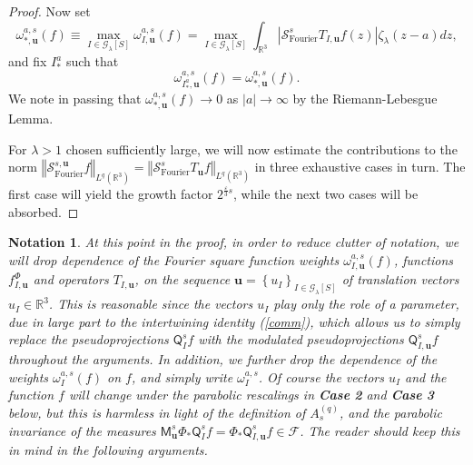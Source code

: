 \documentclass{amsart}%
\theoremstyle{plain}
\newtheorem{notation}[theorem]{Notation}
\numberwithin{equation}{section}
\begin{document}
\begin{proof}
Now set%
\[
\omega_{\ast,\mathbf{u}}^{a,s}\left(  f\right)  \equiv\max_{I\in
\mathcal{G}_{\lambda}\left[  S\right]  }\omega_{I,\mathbf{u}}^{a,s}\left(
f\right)  =\max_{I\in\mathcal{G}_{\lambda}\left[  S\right]  }\int
_{\mathbb{R}^{3}}\left\vert \mathcal{S}_{\operatorname*{Fourier}}%
^{s}T_{I,\mathbf{u}}f\left(  z\right)  \right\vert \zeta_{\lambda}\left(
z-a\right)  dz,
\]
and fix $I_{\ast}^{a}$ such that
\[
\omega_{I_{\ast}^{a},\mathbf{u}}^{a,s}\left(  f\right)  =\omega_{\ast
,\mathbf{u}}^{a,s}\left(  f\right)  .
\]
We note in passing that $\omega_{\ast,\mathbf{u}}^{a,s}\left(  f\right)
\rightarrow0$ as $\left\vert a\right\vert \rightarrow\infty$ by the
Riemann-Lebesgue Lemma.

For $\lambda>1$ chosen sufficiently large, we will now estimate the
contributions to the norm $\left\Vert \mathcal{S}_{\operatorname*{Fourier}%
}^{s,\mathbf{u}}f\right\Vert _{L^{q}\left(  \mathbb{R}^{3}\right)
}=\left\Vert \mathcal{S}_{\operatorname*{Fourier}}^{s}T_{\mathbf{u}%
}f\right\Vert _{L^{q}\left(  \mathbb{R}^{3}\right)  }$ in three exhaustive
cases in turn. The first case will yield the growth factor $2^{\frac
{\varepsilon}{3}s}$, while the next two cases will be absorbed.
\end{proof}

\begin{notation}
At this point in the proof, in order to reduce clutter of notation, we will
drop dependence of the Fourier square function weights $\omega_{I,\mathbf{u}%
}^{a,s}\left(  f\right)  $, functions $f_{I,\mathbf{u}}^{\Phi}$ and operators
$T_{I,\mathbf{u}}$, on the sequence $\mathbf{u}=\left\{  u_{I}\right\}
_{I\in\mathcal{G}_{\lambda}\left[  S\right]  }$ of translation vectors
$u_{I}\in\mathbb{R}^{3}$. This is reasonable since the vectors $u_{I}$ play
only the role of a parameter, due in large part to the intertwining identity
(\ref{comm}), which allows us to simply replace the pseudoprojections
$\mathsf{Q}_{I}^{s}f$ with the modulated pseudoprojections $\mathsf{Q}%
_{I,\mathbf{u}}^{s}f$ throughout the arguments. In addition, we further drop
the dependence of the weights $\omega_{I}^{a,s}\left(  f\right)  $ on $f$, and
simply write $\omega_{I}^{a,s}$. Of course the vectors $u_{I}$ and the
function $f$ will change under the parabolic rescalings in \textbf{Case}
\textbf{2} and \textbf{Case} \textbf{3} below, but this is harmless in light
of the definition of $A_{s}^{\left(  q\right)  }$, and the parabolic
invariance of the measures $\mathsf{M}_{\mathbf{u}}^{s}\Phi_{\ast}%
\mathsf{Q}_{I}^{s}f=\Phi_{\ast}\mathsf{Q}_{I,\mathbf{u}}^{s}f\in\mathcal{F}$.
The reader should keep this in mind in the following arguments.
\end{notation}
\end{document}

